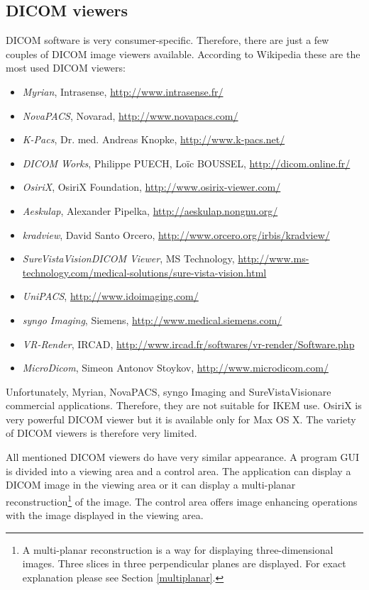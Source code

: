 \subsection{DICOM viewers}
\label{viewers}
DICOM software is very consumer-specific. Therefore, there are just a few couples of DICOM image viewers available. According to Wikipedia these are the most used DICOM viewers:

\begin{itemize}
  \setlength{\itemsep}{0pt}
  \setlength{\parskip}{0pt}
  \setlength{\parsep}{0pt}
\item \emph{Myrian}, Intrasense, \url{http://www.intrasense.fr/}
\item \emph{NovaPACS}, Novarad, \url{http://www.novapacs.com/}
\item \emph{K-Pacs}, Dr. med. Andreas Knopke, \url{http://www.k-pacs.net/}
\item \emph{DICOM Works}, Philippe PUECH, Loïc BOUSSEL, \url{http://dicom.online.fr/}
\item \emph{OsiriX}, OsiriX Foundation, \url{http://www.osirix-viewer.com/}
\item \emph{Aeskulap}, Alexander Pipelka, \url{http://aeskulap.nongnu.org/}
\item \emph{kradview}, David Santo Orcero, \url{http://www.orcero.org/irbis/kradview/}
\item \emph{SureVistaVision\texttrademark DICOM Viewer}, MS Technology, \url{http://www.ms-technology.com/medical-solutions/sure-vista-vision.html}
\item \emph{UniPACS},  \url{http://www.idoimaging.com/}
\item \emph{syngo Imaging}, Siemens, \url{http://www.medical.siemens.com/}
\item \emph{VR-Render}, IRCAD, \url{http://www.ircad.fr/softwares/vr-render/Software.php}
\item \emph{MicroDicom}, Simeon Antonov Stoykov, \url{http://www.microdicom.com/}
\end{itemize}

Unfortunately, Myrian, NovaPACS, syngo Imaging and SureVistaVision\texttrademark are commercial applications. Therefore, they are not suitable for IKEM use. OsiriX is very powerful DICOM viewer but it is available only for Max OS X. The variety of DICOM viewers is therefore very limited.

All mentioned DICOM viewers do have very similar appearance. A program GUI is divided into a viewing area and a control area. The application can display a DICOM image in the viewing area or it can display a multi-planar reconstruction\footnote{A multi-planar reconstruction is a way for displaying three-dimensional images. Three slices in three perpendicular planes are displayed. For exact explanation please see Section \ref{multiplanar}.} of the image. The control area offers image enhancing operations with the image displayed in the viewing area.

